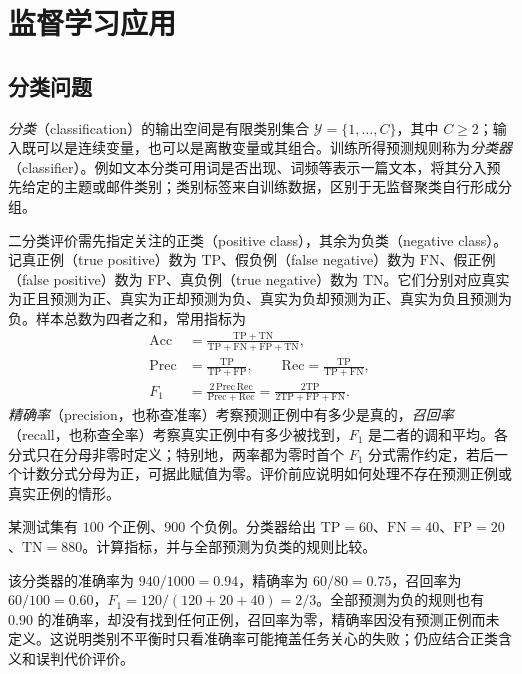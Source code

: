 \section{监督学习应用}
\label{sec:lh-supervised-applications}

\subsection{分类问题}
\label{subsec:lh-classification}

\emph{分类}（classification）的输出空间是有限类别集合 $\mathcal Y=\{1,\ldots,C\}$，其中 $C\geq2$；输入既可以是连续变量，也可以是离散变量或其组合。训练所得预测规则称为\emph{分类器}（classifier）。例如文本分类可用词是否出现、词频等表示一篇文本，将其分入预先给定的主题或邮件类别；类别标签来自训练数据，区别于无监督聚类自行形成分组。

二分类评价需先指定关注的正类（positive class），其余为负类（negative class）。记真正例（true positive）数为 $\mathrm{TP}$、假负例（false negative）数为 $\mathrm{FN}$、假正例（false positive）数为 $\mathrm{FP}$、真负例（true negative）数为 $\mathrm{TN}$。它们分别对应真实为正且预测为正、真实为正却预测为负、真实为负却预测为正、真实为负且预测为负。样本总数为四者之和，常用指标为
\begin{align}
    \mathrm{Acc}
       &=\frac{\mathrm{TP}+\mathrm{TN}}
          {\mathrm{TP}+\mathrm{FN}+\mathrm{FP}+\mathrm{TN}},
          \label{eq:lh-accuracy}\\
    \mathrm{Prec}
       &=\frac{\mathrm{TP}}{\mathrm{TP}+\mathrm{FP}},
    \qquad
    \mathrm{Rec}=\frac{\mathrm{TP}}{\mathrm{TP}+\mathrm{FN}},
          \label{eq:lh-precision-recall}\\
    F_1
       &=\frac{2\,\mathrm{Prec}\,\mathrm{Rec}}{\mathrm{Prec}+\mathrm{Rec}}
        =\frac{2\mathrm{TP}}{2\mathrm{TP}+\mathrm{FP}+\mathrm{FN}}.
          \label{eq:lh-f1}
\end{align}
\emph{精确率}（precision，也称查准率）考察预测正例中有多少是真的，\emph{召回率}（recall，也称查全率）考察真实正例中有多少被找到，$F_1$ 是二者的调和平均。各分式只在分母非零时定义；特别地，两率都为零时首个 $F_1$ 分式需作约定，若后一个计数分式分母为正，可据此赋值为零。评价前应说明如何处理不存在预测正例或真实正例的情形。

\begin{example}
\label{ex:lh-imbalanced-classification}
某测试集有 $100$ 个正例、$900$ 个负例。分类器给出 $\mathrm{TP}=60$、$\mathrm{FN}=40$、$\mathrm{FP}=20$、$\mathrm{TN}=880$。计算指标，并与全部预测为负类的规则比较。
\end{example}
\begin{solve}
该分类器的准确率为 $940/1000=0.94$，精确率为 $60/80=0.75$，召回率为 $60/100=0.60$，$F_1=120/(120+20+40)=2/3$。全部预测为负的规则也有 $0.90$ 的准确率，却没有找到任何正例，召回率为零，精确率因没有预测正例而未定义。这说明类别不平衡时只看准确率可能掩盖任务关心的失败；仍应结合正类含义和误判代价评价。
\end{solve}

